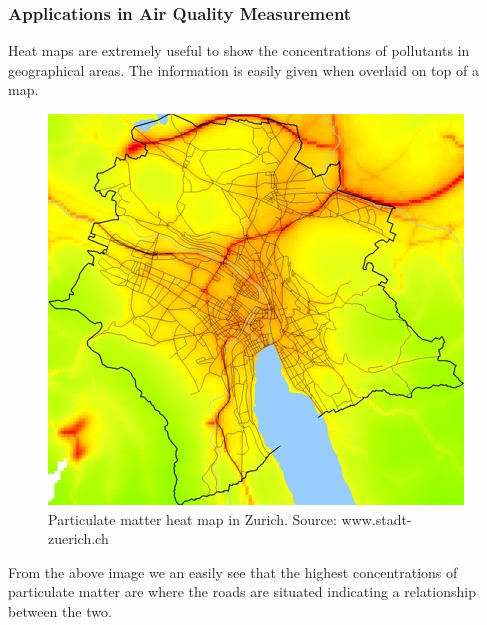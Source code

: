 \subsubsection{Applications in Air Quality Measurement}\label{applicationsinaqmeasurement}

Heat maps are extremely useful to show the concentrations of pollutants in geographical areas. The information is easily given when overlaid on top of a map.  

\begin{figure}[H]
        \begin{center}
                \includegraphics[scale=0.5]{./images/heatmaps/zurichpm.jpg}
                \caption{Particulate matter heat map in Zurich. Source: www.stadt-zuerich.ch}
        \end{center}
\end{figure}

From the above image we an easily see that the highest concentrations of particulate matter are where the roads are situated indicating a relationship between the two. 




